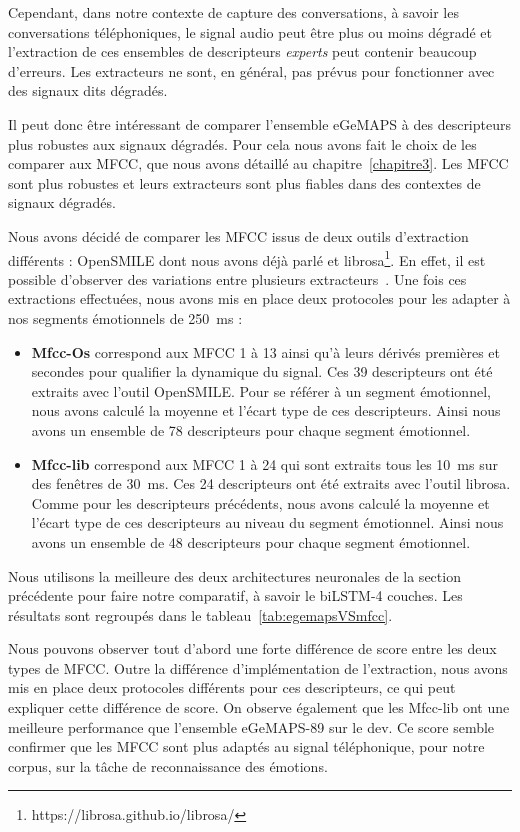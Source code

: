 Cependant, dans notre contexte de capture des conversations, à savoir les conversations téléphoniques, le signal audio peut être plus ou moins dégradé et l'extraction de ces ensembles de descripteurs \textit{experts} peut contenir beaucoup d'erreurs. Les extracteurs ne sont, en général, pas prévus pour fonctionner avec des signaux dits dégradés.

Il peut donc être intéressant de comparer l'ensemble eGeMAPS à des descripteurs plus robustes aux signaux dégradés. Pour cela nous avons fait le choix de les comparer aux MFCC, que nous avons détaillé au chapitre~\ref{chapitre3}. Les MFCC sont plus robustes et leurs extracteurs sont plus fiables dans des contextes de signaux dégradés.

Nous avons décidé de comparer les MFCC issus de deux outils d'extraction différents : OpenSMILE dont nous avons déjà parlé et librosa\footnote{https://librosa.github.io/librosa/}. En effet, il est possible d'observer des variations entre plusieurs extracteurs~\cite{Ganchev2005}. Une fois ces extractions effectuées, nous avons mis en place deux protocoles pour les adapter à nos segments émotionnels de 250~ms :
\begin{itemize}
        \item \textbf{Mfcc-Os} correspond aux MFCC 1 à 13 ainsi qu'à leurs dérivés premières et secondes pour qualifier la dynamique du signal. Ces 39 descripteurs ont été extraits avec l’outil OpenSMILE. Pour se référer à un segment émotionnel, nous avons calculé la moyenne et l'écart type de ces descripteurs. Ainsi nous avons un ensemble de 78 descripteurs pour chaque segment émotionnel.
        \item \textbf{Mfcc-lib} correspond aux MFCC 1 à 24 qui sont extraits tous les 10~ms sur des fenêtres de 30~ms. Ces 24 descripteurs ont été extraits avec l'outil librosa. Comme pour les descripteurs précédents, nous avons calculé la moyenne et l'écart type de ces descripteurs au niveau du segment émotionnel. Ainsi nous avons un ensemble de 48 descripteurs pour chaque segment émotionnel.
    \end{itemize}

Nous utilisons la meilleure des deux architectures neuronales de la section précédente pour faire notre comparatif, à savoir le biLSTM-4 couches. Les résultats sont regroupés dans le tableau~\ref{tab:egemapsVSmfcc}.



Nous pouvons observer tout d'abord une forte différence de score entre les deux types de MFCC. Outre la différence d'implémentation de l'extraction, nous avons mis en place deux protocoles différents pour ces descripteurs, ce qui peut expliquer cette différence de score. On observe également que les Mfcc-lib ont une meilleure performance que l'ensemble eGeMAPS-89 sur le dev. Ce score semble confirmer que les MFCC sont plus adaptés au signal téléphonique, pour notre corpus, sur la tâche de reconnaissance des émotions.

